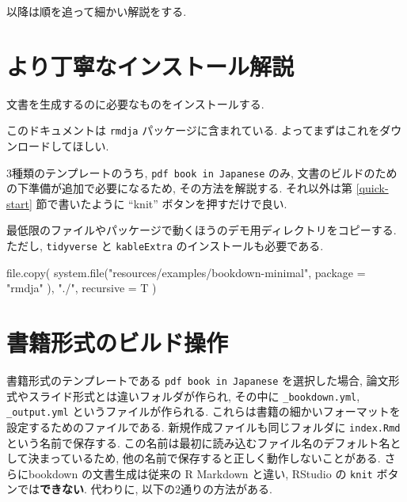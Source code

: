 \documentclass[
]{bxjsbook}
\newenvironment{Shaded}{\begin{snugshade}}{\end{snugshade}}
\newcommand{\AttributeTok}[1]{\textcolor[rgb]{0.77,0.63,0.00}{#1}}
\newcommand{\FunctionTok}[1]{\textcolor[rgb]{0.00,0.00,0.00}{#1}}
\newcommand{\NormalTok}[1]{#1}
\newcommand{\StringTok}[1]{\textcolor[rgb]{0.31,0.60,0.02}{#1}}
\theoremstyle{definition}
\theoremstyle{definition}
\theoremstyle{definition}
\theoremstyle{remark}
\begin{document}
以降は順を追って細かい解説をする.

\hypertarget{ux3088ux308aux4e01ux5be7ux306aux30a4ux30f3ux30b9ux30c8ux30fcux30ebux89e3ux8aac}{%
\section{より丁寧なインストール解説}\label{ux3088ux308aux4e01ux5be7ux306aux30a4ux30f3ux30b9ux30c8ux30fcux30ebux89e3ux8aac}}

文書を生成するのに必要なものをインストールする.

このドキュメントは \texttt{rmdja} パッケージに含まれている.
よってまずはこれをダウンロードしてほしい.

3種類のテンプレートのうち, \texttt{pdf\ book\ in\ Japanese} のみ,
文書のビルドのための下準備が追加で必要になるため, その方法を解説する.
それ以外は第 \ref{quick-start} 節で書いたように ``knit''
ボタンを押すだけで良い.

最低限のファイルやパッケージで動くほうのデモ用ディレクトリをコピーする.
ただし, \texttt{tidyverse} と \texttt{kableExtra}
のインストールも必要である.

\begin{Shaded}
\begin{Highlighting}[numbers=left,,]
\FunctionTok{file.copy}\NormalTok{(}
  \FunctionTok{system.file}\NormalTok{(}\StringTok{"resources/examples/bookdown{-}minimal"}\NormalTok{,}
    \AttributeTok{package =} \StringTok{"rmdja"}
\NormalTok{  ),}
  \StringTok{"./"}\NormalTok{,}
  \AttributeTok{recursive =}\NormalTok{ T}
\NormalTok{)}
\end{Highlighting}
\end{Shaded}

\hypertarget{ux66f8ux7c4dux5f62ux5f0fux306eux30d3ux30ebux30c9ux64cdux4f5c}{%
\section{書籍形式のビルド操作}\label{ux66f8ux7c4dux5f62ux5f0fux306eux30d3ux30ebux30c9ux64cdux4f5c}}

書籍形式のテンプレートである \texttt{pdf\ book\ in\ Japanese}
を選択した場合, 論文形式やスライド形式とは違いフォルダが作られ, その中に
\texttt{\_bookdown.yml}, \texttt{\_output.yml} というファイルが作られる.
これらは書籍の細かいフォーマットを設定するためのファイルである.
新規作成ファイルも同じフォルダに \texttt{index.Rmd}
という名前で保存する.
この名前は最初に読み込むファイル名のデフォルト名として決まっているため,
他の名前で保存すると正しく動作しないことがある. さらにbookdown
の文書生成は従来の R Markdown と違い, RStudio の \texttt{knit}
ボタンでは\textbf{できない}. 代わりに, 以下の2通りの方法がある.
\end{document}
